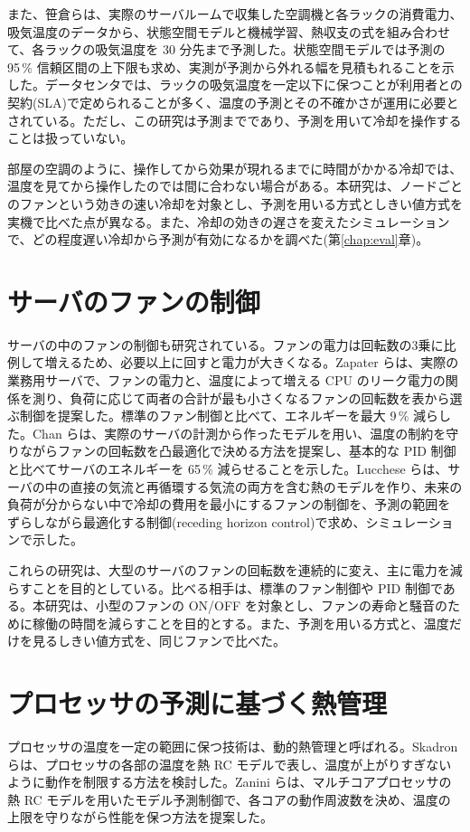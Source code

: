 また、笹倉ら\cite{sasakura2020}は、実際のサーバルームで収集した空調機と各ラックの消費電力、吸気温度のデータから、状態空間モデルと機械学習、熱収支の式を組み合わせて、各ラックの吸気温度を 30 分先まで予測した。状態空間モデルでは予測の 95\,\% 信頼区間の上下限も求め、実測が予測から外れる幅を見積もれることを示した。データセンタでは、ラックの吸気温度を一定以下に保つことが利用者との契約(SLA)で定められることが多く、温度の予測とその不確かさが運用に必要とされている。ただし、この研究は予測までであり、予測を用いて冷却を操作することは扱っていない。

部屋の空調のように、操作してから効果が現れるまでに時間がかかる冷却では、温度を見てから操作したのでは間に合わない場合がある。本研究は、ノードごとのファンという効きの速い冷却を対象とし、予測を用いる方式としきい値方式を実機で比べた点が異なる。また、冷却の効きの遅さを変えたシミュレーションで、どの程度遅い冷却から予測が有効になるかを調べた(第\ref{chap:eval}章)。

\section{サーバのファンの制御}\label{sec:rel-fan}
サーバの中のファンの制御も研究されている。ファンの電力は回転数の3乗に比例して増えるため、必要以上に回すと電力が大きくなる\cite{zapater2013leakage}。Zapater ら\cite{zapater2013leakage}は、実際の業務用サーバで、ファンの電力と、温度によって増える CPU のリーク電力の関係を測り、負荷に応じて両者の合計が最も小さくなるファンの回転数を表から選ぶ制御を提案した。標準のファン制御と比べて、エネルギーを最大 9\,\% 減らした。Chan ら\cite{chan2018cooling}は、実際のサーバの計測から作ったモデルを用い、温度の制約を守りながらファンの回転数を凸最適化で決める方法を提案し、基本的な PID 制御と比べてサーバのエネルギーを 65\,\% 減らせることを示した。Lucchese ら\cite{lucchese2017servers}は、サーバの中の直接の気流と再循環する気流の両方を含む熱のモデルを作り、未来の負荷が分からない中で冷却の費用を最小にするファンの制御を、予測の範囲をずらしながら最適化する制御(receding horizon control)で求め、シミュレーションで示した。

これらの研究は、大型のサーバのファンの回転数を連続的に変え、主に電力を減らすことを目的としている。比べる相手は、標準のファン制御や PID 制御である。本研究は、小型のファンの ON/OFF を対象とし、ファンの寿命と騒音のために稼働の時間を減らすことを目的とする。また、予測を用いる方式と、温度だけを見るしきい値方式を、同じファンで比べた。

\section{プロセッサの予測に基づく熱管理}\label{sec:rel-dtm}
プロセッサの温度を一定の範囲に保つ技術は、動的熱管理と呼ばれる。Skadron ら\cite{skadron2003temperature}は、プロセッサの各部の温度を熱 RC モデルで表し、温度が上がりすぎないように動作を制限する方法を検討した。Zanini ら\cite{zanini2009multicore}は、マルチコアプロセッサの熱 RC モデルを用いたモデル予測制御で、各コアの動作周波数を決め、温度の上限を守りながら性能を保つ方法を提案した。

